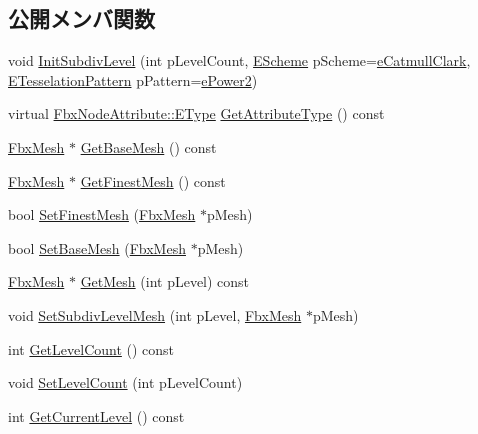 \subsection*{公開メンバ関数}
\begin{DoxyCompactItemize}
\item 
void \hyperlink{class_fbx_sub_div_aef825ae0a9a2c6973f0cc632f8f1fe43}{Init\+Subdiv\+Level} (int p\+Level\+Count, \hyperlink{class_fbx_sub_div_aecdd4fdebb20f2796363989eba8ee9f5}{E\+Scheme} p\+Scheme=\hyperlink{class_fbx_sub_div_aecdd4fdebb20f2796363989eba8ee9f5a704e0c326608197ed346cae170291408}{e\+Catmull\+Clark}, \hyperlink{class_fbx_sub_div_a06cb3da0d9b384dc83585caa49f46684}{E\+Tesselation\+Pattern} p\+Pattern=\hyperlink{class_fbx_sub_div_a06cb3da0d9b384dc83585caa49f46684a9f9be689f1d831d329f4ea19d672ac63}{e\+Power2})
\item 
virtual \hyperlink{class_fbx_node_attribute_a08e1669d3d1a696910756ab17de56d6a}{Fbx\+Node\+Attribute\+::\+E\+Type} \hyperlink{class_fbx_sub_div_ac109cef6a177563eab80e28d414289a3}{Get\+Attribute\+Type} () const
\item 
\hyperlink{class_fbx_mesh}{Fbx\+Mesh} $\ast$ \hyperlink{class_fbx_sub_div_a8b14dd17531d8e7e970a0f27061c992c}{Get\+Base\+Mesh} () const
\item 
\hyperlink{class_fbx_mesh}{Fbx\+Mesh} $\ast$ \hyperlink{class_fbx_sub_div_aa3a7a320d1a1800ae4d59bd372a4beb0}{Get\+Finest\+Mesh} () const
\item 
bool \hyperlink{class_fbx_sub_div_a2205b6c841b523ff9bf80cc473a7aa4e}{Set\+Finest\+Mesh} (\hyperlink{class_fbx_mesh}{Fbx\+Mesh} $\ast$p\+Mesh)
\item 
bool \hyperlink{class_fbx_sub_div_aedeac30c9b067676bfbeb7ba95015ad6}{Set\+Base\+Mesh} (\hyperlink{class_fbx_mesh}{Fbx\+Mesh} $\ast$p\+Mesh)
\item 
\hyperlink{class_fbx_mesh}{Fbx\+Mesh} $\ast$ \hyperlink{class_fbx_sub_div_a705af0c50cdd202b19bdce9c36d90f01}{Get\+Mesh} (int p\+Level) const
\item 
void \hyperlink{class_fbx_sub_div_a6185a554b2c8f5718631a62a8f6656b8}{Set\+Subdiv\+Level\+Mesh} (int p\+Level, \hyperlink{class_fbx_mesh}{Fbx\+Mesh} $\ast$p\+Mesh)
\item 
int \hyperlink{class_fbx_sub_div_a645409b53d249062c2a22c224d27287a}{Get\+Level\+Count} () const
\item 
void \hyperlink{class_fbx_sub_div_a6ddec560144de0e8cc18ebf4c56ede8a}{Set\+Level\+Count} (int p\+Level\+Count)
\item 
int \hyperlink{class_fbx_sub_div_a76ae5f09e9af063bfdfa8bbbcdcf5b33}{Get\+Current\+Level} () const

\end{DoxyCompactItemize}
